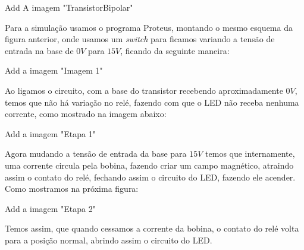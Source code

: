 	
	Add A imagem "TransistorBipolar"
	
Para a simulação usamos o programa Proteus, montando o mesmo esquema da figura anterior, onde usamos um \textit{switch}  para ficamos variando a tensão de entrada na base de $ 0 V $ para $ 15 V $, ficando da seguinte maneira:

	Add a imagem "Imagem 1"

Ao ligamos o circuito, com a base do transistor recebendo aproximadamente $ 0 V $, temos que não há variação no relé, fazendo com que o LED não receba nenhuma corrente, como mostrado na imagem abaixo:

	Add a imagem "Etapa 1"
	
Agora mudando a tensão de entrada da base para $ 15 V $ temos que internamente, uma corrente circula pela bobina, fazendo criar um campo magnético, atraindo assim o contato do relé, fechando assim o circuito do LED, fazendo ele acender. Como mostramos na próxima figura:

	Add a imagem "Etapa 2"
	
Temos assim, que quando cessamos a corrente da bobina, o contato do relé volta para a posição normal, abrindo assim o circuito do LED.

	
	

